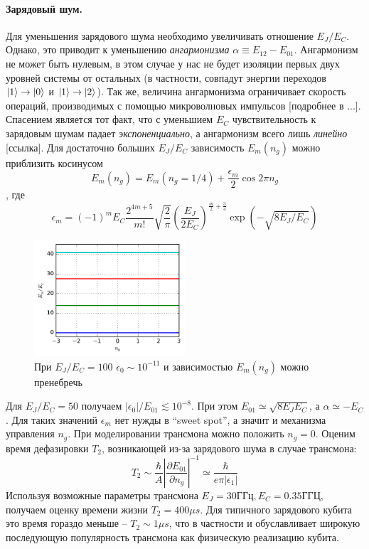 \documentclass[12pt, twoside]{report}
\DeclarePairedDelimiter\ket{\lvert}{\rangle}
\numberwithin{equation}{section}
\numberwithin{figure}{section}
\begin{document}
\paragraph{Зарядовый шум.} Для уменьшения зарядового шума необходимо увеличивать отношение $E_J / E_C$. Однако, это приводит к уменьшению \textit{ангармонизма} $\alpha \equiv E_{12} - E_{01}$. Ангармонизм не может быть нулевым, в этом случае у нас не будет изоляции первых двух уровней системы от остальных (в частности, совпадут энергии переходов $\ket{1} \rightarrow \ket{0}$ и $\ket{1} \rightarrow \ket{2}$). Так же, величина ангармонизма ограничивает скорость операций, производимых с помощью микроволновых импульсов [подробнее в ...].
\newline
Спасением является тот факт, что с уменьшием $E_C$ чувствительность к зарядовым шумам падает \textit{экспоненциально}, а ангармонизм всего лишь \textit{линейно} [ссылка]. Для достаточно больших $E_J/E_C$ зависимость $E_m(n_g)$ можно приблизить косинусом 
\begin{equation}
E_m\left(n_g\right) = E_m(n_g = 1/4) + \frac{\epsilon_m}{2}  \cos 2 \pi n_g 
\end{equation}
, где
\begin{equation}
\epsilon_m  = (-1)^m E_C \frac{2^{4m +5}}{m!} \sqrt{\frac{2}{\pi}} \left( \frac{E_J}{2 E_C} \right) ^ {\frac{m}{2} + \frac{3}{4}} \exp {\left( - \sqrt{8 E_J / E_C} \right)} 
\end{equation}
\linebreak
\begin{figure}
\includegraphics[width=0.5\textwidth ]{Pictures2/transmon_100}
\caption{При $E_J/E_C = 100$ $\epsilon_0 \sim 10^{-11}$ и зависимостью $E_m(n_g)$ можно пренебречь}
\label{fig:transmon-eigens}
\end{figure}
Для $E_J/E_C = 50$ получаем $\left|\epsilon_0\right| /  E_{01} \lesssim 10^{-8}$. При этом $E_{01} \simeq \sqrt{8 E_J E_C}$, а $\alpha \simeq - E_C$.
Для таких значений $\epsilon_m$ нет нужды в ``sweet spot'', а значит и механизма управления $n_g$. При моделировании трансмона можно положить $n_g = 0$. Оценим время дефазировки $T_2$, возникающей из-за зарядового шума в случае трансмона:
\begin{equation}
T_2 \sim \frac{\hbar}{A} \left|\frac{\partial E_{01}}{\partial n_g}\right|^{-1} \simeq \frac{\hbar}{e \pi \left| \epsilon_1 \right|}
\end{equation}
Используя возможные параметры трансмона $E_J = 30 ГГц, E_C = 0.35 ГГЦ$, получаем оценку времени жизни $T_2 = 400\mu s$. Для типичного зарядового кубита это время гораздо меньше -- $T_2 \sim 1\mu s$, что в частности и обуславливает широкую последующую популярность трансмона как физическую реализацию кубита. 
\newline
\end{document}
